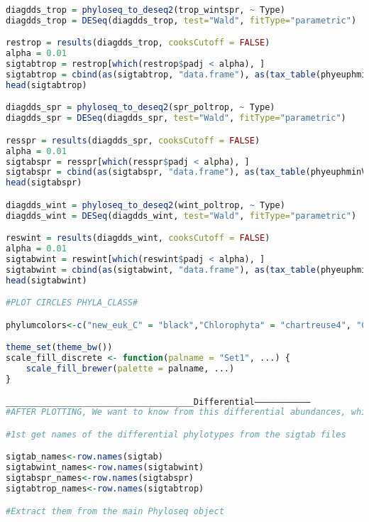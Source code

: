 \documentclass{article}
\begin{document}
\begin{lstlisting}[language=R,caption={N1N2figscripts}]
diagdds_trop = phyloseq_to_deseq2(trop_wintspr, ~ Type)
diagdds_trop = DESeq(diagdds_trop, test="Wald", fitType="parametric")

restrop = results(diagdds_trop, cooksCutoff = FALSE)
alpha = 0.01
sigtabtrop = restrop[which(restrop$padj < alpha), ]
sigtabtrop = cbind(as(sigtabtrop, "data.frame"), as(tax_table(phyeuphminV1filt)[rownames(sigtabtrop), ], "matrix"))
head(sigtabtrop)

diagdds_spr = phyloseq_to_deseq2(spr_poltrop, ~ Type)
diagdds_spr = DESeq(diagdds_spr, test="Wald", fitType="parametric")

resspr = results(diagdds_spr, cooksCutoff = FALSE)
alpha = 0.01
sigtabspr = resspr[which(resspr$padj < alpha), ]
sigtabspr = cbind(as(sigtabspr, "data.frame"), as(tax_table(phyeuphminV1filt)[rownames(sigtabspr), ], "matrix"))
head(sigtabspr)

diagdds_wint = phyloseq_to_deseq2(wint_poltrop, ~ Type)
diagdds_wint = DESeq(diagdds_wint, test="Wald", fitType="parametric")

reswint = results(diagdds_wint, cooksCutoff = FALSE)
alpha = 0.01
sigtabwint = reswint[which(reswint$padj < alpha), ]
sigtabwint = cbind(as(sigtabwint, "data.frame"), as(tax_table(phyeuphminV1filt)[rownames(sigtabwint), ], "matrix"))
head(sigtabwint)

#PLOT CIRCLES PHYLA_CLASS#

phylumcolors<-c("new_euk_C" = "black","Chlorophyta" = "chartreuse4", "Cryptophyta" = "deeppink","Cyanobacteria"="purple", "Alveolata"="brown", "new_euk_A"="darkseagreen","Haptophyta"="orange","Eusiphoniidae"="gray", "NA" = "firebrick", "Stramenopiles"="darkturquoise"," Rhodophyta"="antiquewhite3")

theme_set(theme_bw())
scale_fill_discrete <- function(palname = "Set1", ...) {
    scale_fill_brewer(palette = palname, ...)
}

_____________________________________Differential———————————
#AFTER PLOTTING, We want to know from this differential abundances, which ones didn’t have a representative in winter. Overwintering/NonOverwintering Add the Overwintering/No OV condition 

#1st get names of the differential phylotypes from the sigtab files

sigtab_names<-row.names(sigtab)
sigtabwint_names<-row.names(sigtabwint)
sigtabspr_names<-row.names(sigtabspr)
sigtabtrop_names<-row.names(sigtabtrop)

#Extract them from the main Phyloseq object


\end{lstlisting}
\end{document}
